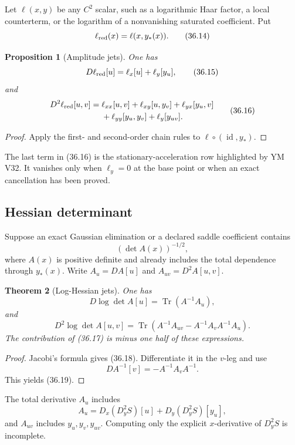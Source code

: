 \documentclass[11pt]{article}
\newtheorem{theorem}{Theorem}[section]
\newtheorem{proposition}[theorem]{Proposition}
\newcommand{\Tr}{\operatorname{Tr}}
\begin{document}
Let \(\ell(x,y)\) be any \(C^2\) scalar, such as a logarithmic Haar
factor, a local counterterm, or the logarithm of a nonvanishing
saturated coefficient.  Put
\[
 \ell_{\rm red}(x)=\ell(x,y_*(x)).
 \tag{36.14}
\]

\begin{proposition}[Amplitude jets]
\label{prop:v11v36-amplitude}
One has
\[
 D\ell_{\rm red}[u]
 =
 \ell_x[u]+\ell_y[y_u],
 \tag{36.15}
\]
and
\[
 \begin{split}
 D^2\ell_{\rm red}[u,v]
 ={}&
 \ell_{xx}[u,v]
 +\ell_{xy}[u,y_v]
 +\ell_{yx}[y_u,v]\\
 &+\ell_{yy}[y_u,y_v]
 +\ell_y[y_{uv}].
 \end{split}
 \tag{36.16}
\]
\end{proposition}

\begin{proof}
Apply the first- and second-order chain rules to
\(\ell\circ(\operatorname{id},y_*)\).
\end{proof}

The last term in (36.16) is the stationary-acceleration row highlighted
by YM V32.  It vanishes only when \(\ell_y=0\) at the base point or
when an exact cancellation has been proved.

\subsection{Hessian determinant}

Suppose an exact Gaussian elimination or a declared saddle coefficient
contains
\[
 (\det A(x))^{-1/2},
 \tag{36.17}
\]
where \(A(x)\) is positive definite and already includes the total
dependence through \(y_*(x)\).  Write \(A_u=DA[u]\) and
\(A_{uv}=D^2A[u,v]\).

\begin{theorem}[Log-Hessian jets]
\label{thm:v11v36-logdet}
One has
\[
 D\log\det A[u]
 =
 \Tr(A^{-1}A_u),
 \tag{36.18}
\]
and
\[
 D^2\log\det A[u,v]
 =
 \Tr\left(
 A^{-1}A_{uv}
 -A^{-1}A_vA^{-1}A_u
 \right).
 \tag{36.19}
\]
The contribution of (36.17) is minus one half of these expressions.
\end{theorem}

\begin{proof}
Jacobi's formula gives (36.18).  Differentiate it in the \(v\)-leg and
use
\[
 D A^{-1}[v]=-A^{-1}A_vA^{-1}.
\]
This yields (36.19).
\end{proof}

The total derivative \(A_u\) includes
\[
 A_u=
 D_x(D_y^2S)[u]+D_y(D_y^2S)[y_u],
 \tag{36.20}
\]
and \(A_{uv}\) includes \(y_u,y_v,y_{uv}\).  Computing only the explicit
\(x\)-derivative of \(D_y^2S\) is incomplete.
\end{document}
